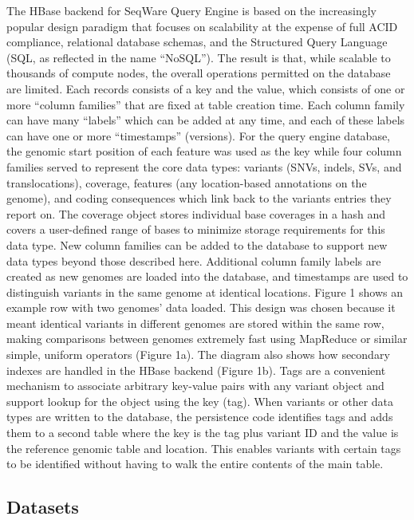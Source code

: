 \documentclass[10pt]{bmc_article}
\newenvironment{bmcformat}{\begin{raggedright}\baselineskip20pt\sloppy\setboolean{publ}{false}}{\end{raggedright}\baselineskip20pt\sloppy}
\begin{document}
\begin{bmcformat}
The HBase backend for SeqWare Query Engine is based on the increasingly popular design paradigm that focuses on scalability at the expense of full ACID compliance, relational database schemas, and the Structured Query Language (SQL, as reflected in the name “NoSQL”). The result is that, while scalable to thousands of compute nodes, the overall operations permitted on the database are limited. Each records consists of a key  and the value, which consists of one or more “column families” that are fixed at table creation time. Each column family can have many “labels” which can be added at any time, and each of these labels can have one or more “timestamps” (versions). For the query engine database, the genomic start position of each feature was used as the key while four column families served to represent the core data types: variants (SNVs, indels, SVs, and translocations), coverage, features (any location-based annotations on the genome), and coding consequences which link back to the variants entries they report on. The coverage object stores individual base coverages in a hash and covers a user-defined range of bases to minimize storage requirements for this data type. New column families can be added to the database to support new data types beyond those described here. Additional column family labels are created as new genomes are loaded into the database, and timestamps are used to distinguish variants in the same genome at identical locations. Figure 1 shows an example row with two genomes’ data loaded. This design was chosen because it meant identical variants in different genomes are stored within the same row, making comparisons between genomes extremely fast using MapReduce or similar simple, uniform operators (Figure 1a). The diagram also shows how secondary indexes are handled in the HBase backend (Figure 1b). Tags are a convenient mechanism to associate arbitrary key-value pairs with any variant object and support lookup for the object using the key (tag). When variants or other data types are written to the database, the persistence code identifies tags and adds them to a second table where the key is the tag plus variant ID and the value is the reference genomic table and location. This enables variants with certain tags to be identified without having to walk the entire contents of the main table. 

\subsection*{Datasets}


\end{bmcformat}
\end{document}
